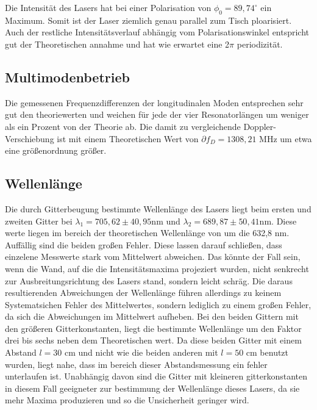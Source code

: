 Die Intensität des Lasers hat bei einer Polarisation von $\phi_0 = 89,74^{\circ}$ ein Maximum.
Somit ist der Laser ziemlich genau parallel zum Tisch ploarisiert. 
Auch der restliche Intensitätsverlauf abhängig vom Polarisationswinkel entspricht gut der Theoretischen annahme 
und hat wie erwartet eine 2$\pi$ periodizität.


\subsection{Multimodenbetrieb}

Die gemessenen Frequenzdifferenzen der longitudinalen Moden entsprechen sehr gut den theoriewerten und weichen für jede der 
vier Resonatorlängen um weniger als ein Prozent von der Theorie ab.
Die damit zu vergleichende Doppler-Verschiebung ist mit einem Theoretischen Wert von $\partial f_D = 1308,21$ MHz 
um etwa eine größenordnung größer.


\subsection{Wellenlänge}

Die durch Gitterbeugung bestimmte Wellenlänge des Lasers liegt beim ersten und zweiten Gitter bei 
$\lambda_1 = 705,62 \pm 40,95 \si{\nano\meter}$ und $\lambda_2 = 689,87 \pm 50,41 \si{\nano\meter}$.
Diese werte liegen im bereich der theoretischen Wellenlänge von um die 632,8 nm.
Auffällig sind die beiden großen Fehler. Diese lassen darauf schließen, dass einzelene Messwerte stark vom Mittelwert abweichen. 
Das könnte der Fall sein, wenn die Wand, auf die die Intensitätsmaxima projeziert wurden, nicht senkrecht zur 
Ausbreitungsrichtung des Lasers stand, sondern leicht schräg. Die daraus resultierenden Abweichungen der Wellenlänge führen allerdings 
zu keinem Systematsichen Fehler des Mittelwertes, sondern lediglich zu einem großen Fehler, da sich die Abweichungen im Mittelwert aufheben. 
Bei den beiden Gittern mit den größeren Gitterkonstanten, liegt die bestimmte Wellenlänge um den Faktor drei bis sechs 
neben dem Theoretischen wert. Da diese beiden Gitter mit einem Abstand $l = 30$ cm und nicht wie die beiden anderen mit $l = 50$ cm 
benutzt wurden, liegt nahe, dass im bereich dieser Abstandsmessung ein fehler unterlaufen ist. 
Unabhängig davon sind die Gitter mit kleineren gitterkonstanten in diesem Fall geeigneter zur bestimmung der Wellenlänge dieses Lasers, da sie 
mehr Maxima produzieren und so die Unsicherheit geringer wird.


